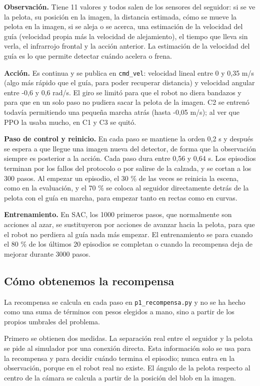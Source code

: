 \documentclass[11pt,a4paper]{article}
\newcommand{\cod}[1]{\texttt{\small #1}}
\begin{document}
\textbf{Observación.} Tiene 11 valores y todos salen de los sensores del seguidor: si se ve la pelota, su
posición en la imagen, la distancia estimada, cómo se mueve la pelota en la imagen, si se aleja o se acerca, una
estimación de la velocidad del guía (velocidad propia más la velocidad de alejamiento), el tiempo que lleva sin
verla, el infrarrojo frontal y la acción anterior. La estimación de la velocidad del guía es lo que permite
detectar cuándo acelera o frena.

\textbf{Acción.} Es continua y se publica en \cod{cmd\_vel}: velocidad lineal entre 0 y 0,35 m/s (algo más rápido
que el guía, para poder recuperar distancia) y velocidad angular entre -0,6 y 0,6 rad/s. El giro se limitó para
que el robot no diera bandazos y para que en un solo paso no pudiera sacar la pelota de la imagen. C2 se
entrenó todavía permitiendo una pequeña marcha atrás (hasta -0,05 m/s); al ver que PPO la usaba mucho, en C1 y
C3 se quitó.

\textbf{Paso de control y reinicio.} En cada paso se mantiene la orden 0,2 s y después se espera a que llegue una
imagen nueva del detector, de forma que la observación siempre es posterior a la acción. Cada paso dura entre
0,56 y 0,64 s. Los episodios terminan por los fallos del protocolo o por salirse de la calzada, y se cortan a los
300 pasos. Al empezar un episodio, el 30 \% de las veces se reinicia la escena, como en la evaluación, y el 70 \%
se coloca al seguidor directamente detrás de la pelota con el guía en marcha, para empezar tanto en rectas como
en curvas.

\textbf{Entrenamiento.} En SAC, los 1000 primeros pasos, que normalmente son acciones al azar, se sustituyeron
por acciones de avanzar hacia la pelota, para que el robot no perdiera al guía nada más empezar. El
entrenamiento se para cuando el 80 \% de los últimos 20 episodios se completan o cuando la recompensa deja de
mejorar durante 3000 pasos.

\subsection{Cómo obtenemos la recompensa}

La recompensa se calcula en cada paso en \cod{p1\_recompensa.py} y no se ha hecho como una suma de términos con
pesos elegidos a mano, sino a partir de los propios umbrales del problema.

Primero se obtienen dos medidas. La separación real entre el seguidor y la pelota se pide al simulador por una
conexión directa. Esta información solo se usa para la recompensa y para decidir cuándo termina el episodio;
nunca entra en la observación, porque en el robot real no existe. El ángulo de la pelota respecto al centro de
la cámara se calcula a partir de la posición del blob en la imagen.
\end{document}
